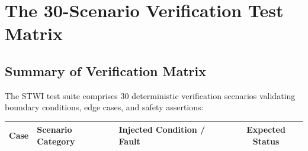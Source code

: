 \chapter{The 30-Scenario Verification Test Matrix}
\label{appendix:testcases}

\section{Summary of Verification Matrix}
The STWI test suite comprises 30 deterministic verification scenarios validating boundary conditions, edge cases, and safety assertions:

\begin{longtable}{|c|p{4.2cm}|p{4.8cm}|c|}
\hline
\rowcolor{blue!10}
\textbf{Case} & \textbf{Scenario Category} & \textbf{Injected Condition / Fault} & \textbf{Expected Status} \\
\hline
\endhead


\end{longtable}
